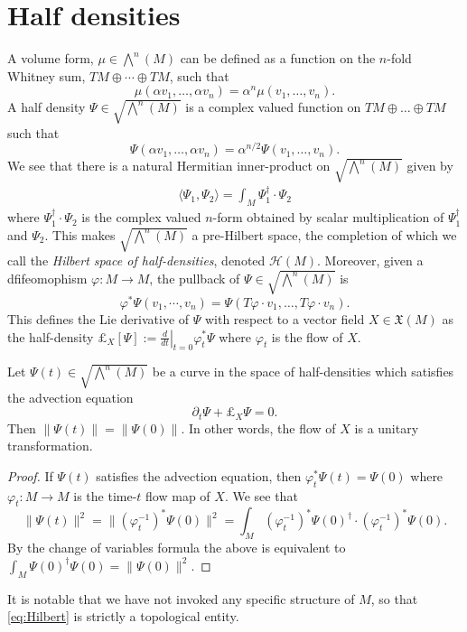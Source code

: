 \section{Half densities}
A volume form, $\mu \in \bigwedge^n(M)$ can be defined as a function on the $n$-fold Whitney sum, $TM \oplus \cdots \oplus TM$, such that
\[
	\mu( \alpha v_1, \dots, \alpha v_n) = \alpha^n \mu( v_1, \dots, v_n).
\]
A half density $\Psi \in  \sqrt{ \bigwedge^n(M) }$ is a complex valued function on $TM \oplus \dots \oplus TM$ such that
\[
	\Psi( \alpha v_1, \dots, \alpha v_n) = \alpha^{n/2} \Psi( v_1, \dots, v_n).
\]
We see that there is a natural Hermitian inner-product on $\sqrt{\bigwedge^n(M)}$ given by
\begin{align}
	\langle \Psi_1, \Psi_2 \rangle = \int_M \Psi_1^\dagger \cdot \Psi_2 \label{eq:Hilbert}
\end{align}
where $\Psi_1^\dagger \cdot \Psi_2$ is the complex valued $n$-form obtained by scalar multiplication of $\Psi_1^\dagger$ and $\Psi_2$.
This makes $\sqrt{ \bigwedge^n(M)}$ a pre-Hilbert space, the completion of which we call the \emph{Hilbert space of half-densities}, denoted $\mathcal{H}(M)$.
Moreover, given a dfifeomophism $\varphi: M \to M$, the pullback of $\Psi \in \sqrt{ \bigwedge^n(M)}$ is
\[
	\varphi^* \Psi( v_1, \cdots , v_n) = \Psi( T\varphi \cdot v_1, \dots, T\varphi \cdot v_n).
\]
This defines the Lie derivative of $\Psi$ with respect to a vector field $X \in \mathfrak{X}(M)$ as the half-density $\pounds_X[ \Psi] := \left. \frac{d}{dt} \right|_{t=0} \varphi_t^* \Psi$ where $\varphi_t$ is the flow of $X$.

\begin{proposition} \label{prop:half_density}
	Let $\Psi(t) \in \sqrt{ \bigwedge^n(M)}$ be a curve in the space of half-densities which satisfies the advection equation
	\[
		\partial_t \Psi + \pounds_X \Psi = 0.
	\]
	Then $\| \Psi(t) \| = \| \Psi(0) \|$.  In other words, the flow of $X$ is a unitary transformation.
\end{proposition}
\begin{proof}
	If $\Psi(t)$ satisfies the advection equation, then $\varphi_t^*\Psi(t) = \Psi(0)$ where $\varphi_t : M \to M$ is the time-$t$ flow map of $X$.  We see that
	\[
		\| \Psi(t) \|^2 = \| (\varphi_t^{-1})^* \Psi(0) \|^2 = \int_M (\varphi_t^{-1})^* \Psi(0)^\dagger \cdot (\varphi_t^{-1})^* \Psi(0).
	\]
	By the change of variables formula the above is equivalent to $\int_M \Psi(0)^\dagger \Psi(0) = \| \Psi(0) \|^2$.
\end{proof}
It is notable that we have not invoked any specific structure of $M$, so that \eqref{eq:Hilbert} is strictly a topological entity.

